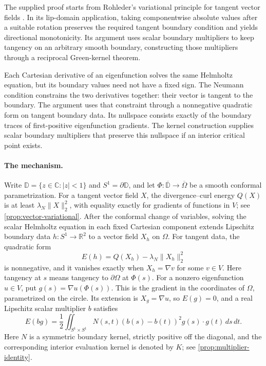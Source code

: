 The supplied proof starts from Rohleder's variational principle for tangent vector
fields \cite{Rohleder,Roh24}. In its lip-domain application, taking
componentwise absolute values after a suitable rotation preserves the
required tangent boundary condition and yields directional monotonicity.
Its argument uses scalar boundary multipliers to keep tangency on an
arbitrary smooth boundary, constructing those multipliers through a
reciprocal Green-kernel theorem.

Each Cartesian derivative of an eigenfunction solves the same Helmholtz
equation, but its boundary values need not have a fixed sign. The Neumann
condition constrains the two derivatives together: their vector is tangent
to the boundary. The argument uses that constraint through a nonnegative quadratic
form on tangent boundary data. Its nullspace consists exactly of the
boundary traces of first-positive eigenfunction gradients. The kernel
construction supplies scalar boundary multipliers that preserve this nullspace if an
interior critical point exists.

\paragraph{The mechanism.}
Write $\mathbb D=\{z\in\mathbb C:|z|<1\}$ and $S^1=\partial\mathbb D$,
and let $\Phi:\overline{\mathbb D}\to\overline\Omega$ be a smooth
conformal parametrization. For a tangent vector field $X$, the
divergence--curl energy $Q(X)$ is at least $\lambda_N\|X\|_2^2$, with equality
exactly for gradients of functions in $V$; see \cref{prop:vector-variational}.
After the conformal change of variables, solving the scalar Helmholtz
equation in each fixed Cartesian component extends Lipschitz boundary
data $h:S^1\to\mathbb R^2$ to a vector field $X_h$ on $\Omega$.
For tangent data, the quadratic form
\[
 E(h)=Q(X_h)-\lambda_N\|X_h\|_2^2
\]
is nonnegative, and it vanishes exactly when $X_h=\nabla v$ for some
$v\in V$. Here tangency at $s$ means tangency to $\partial\Omega$ at
$\Phi(s)$. For a nonzero eigenfunction $u\in V$, put
$g(s)=\nabla u(\Phi(s))$. This is the gradient in the coordinates of
$\Omega$, parametrized on the circle. Its extension is $X_g=\nabla u$,
so $E(g)=0$, and a real Lipschitz scalar multiplier $b$ satisfies
\[
 E(bg)=\frac12\iint_{S^1\times S^1}
 N(s,t)(b(s)-b(t))^2g(s)\cdot g(t)\,ds\,dt.
\]
Here $N$ is a symmetric boundary kernel, strictly positive off the
diagonal, and the corresponding interior
evaluation kernel is denoted by $K$; see \cref{prop:multiplier-identity}.

